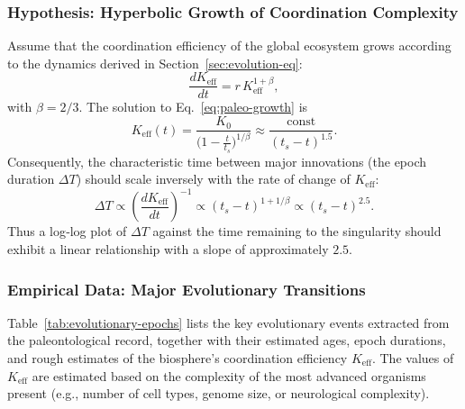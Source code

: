\documentclass[12pt,a4paper]{article}
\theoremstyle{remark}
\begin{document}
	\subsubsection{Hypothesis: Hyperbolic Growth of Coordination Complexity}
	
	Assume that the coordination efficiency of the global ecosystem grows according to the dynamics derived in Section~\ref{sec:evolution-eq}:
	\begin{equation}
		\frac{dK_{\mathrm{eff}}}{dt} = r \, K_{\mathrm{eff}}^{1+\beta},
		\label{eq:paleo-growth}
	\end{equation}
	with \(\beta = 2/3\). The solution to Eq.~\eqref{eq:paleo-growth} is
	\begin{equation}
		K_{\mathrm{eff}}(t) = \frac{K_0}{\bigl(1 - \frac{t}{t_s}\bigr)^{1/\beta}} \approx \frac{\text{const}}{(t_s - t)^{1.5}}.
		\label{eq:paleo-keff}
	\end{equation}
	Consequently, the characteristic time between major innovations (the epoch duration \(\Delta T\)) should scale inversely with the rate of change of \(K_{\mathrm{eff}}\):
	\begin{equation}
		\Delta T \propto \left( \frac{dK_{\mathrm{eff}}}{dt} \right)^{-1} \propto (t_s - t)^{1 + 1/\beta} \propto (t_s - t)^{2.5}.
		\label{eq:paleo-dT}
	\end{equation}
	Thus a log‑log plot of \(\Delta T\) against the time remaining to the singularity should exhibit a linear relationship with a slope of approximately \(2.5\).
	
	\subsubsection{Empirical Data: Major Evolutionary Transitions}
	
	Table~\ref{tab:evolutionary-epochs} lists the key evolutionary events extracted from the paleontological record, together with their estimated ages, epoch durations, and rough estimates of the biosphere's coordination efficiency \(K_{\mathrm{eff}}\). The values of \(K_{\mathrm{eff}}\) are estimated based on the complexity of the most advanced organisms present (e.g., number of cell types, genome size, or neurological complexity).
	
\end{document}
